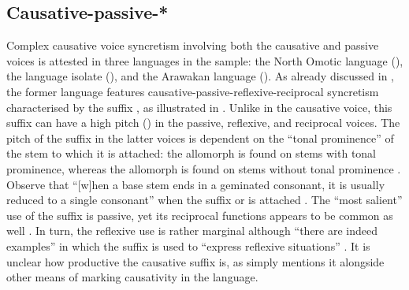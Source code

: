 \subsection{Causative-passive-*} \label{sec:complex-syncretism:caus-pass}
Complex causative voice syncretism involving both the causative and passive voices is attested in three languages in the sample: the North Omotic language  (), the language isolate  (), and the Arawakan language  (). As already discussed in , the former language features causative-passive-reflexive-reciprocal syncretism characterised by the suffix , as illustrated in . Unlike in the causative voice, this suffix can have a high pitch () in the passive, reflexive, and reciprocal voices. The pitch of the suffix in the latter voices is dependent on the “tonal prominence” of the stem to which it is attached: the allomorph  is found on stems with tonal prominence, whereas the allomorph  is found on stems without tonal prominence \citep[84ff., 1013]{wakasa:2008}. Observe that “[w]hen a base stem ends in a geminated consonant, it is usually reduced to a single consonant” when the suffix  or  is attached \citep[1014]{wakasa:2008}. The “most salient” use of the suffix  is passive, yet its reciprocal functions appears to be common as well \citep[1022ff.]{wakasa:2008}. In turn, the reflexive use is rather marginal although “there are indeed examples” in which the suffix is used to “express reflexive situations” \citep[1028]{wakasa:2008}. It is unclear how productive the causative suffix is, as \citet[1005ff.]{wakasa:2008} simply mentions it alongside other means of marking causativity in the language.

